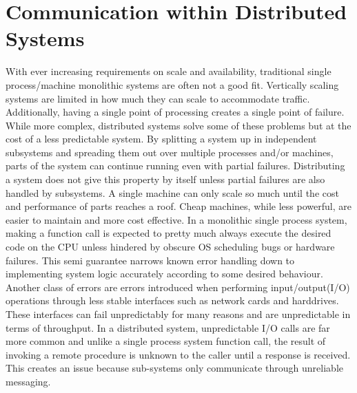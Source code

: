 \documentclass[11pt]{article}
\begin{document}
\clearpage

\tableofcontents
\clearpage
\section{Communication within Distributed Systems}
With ever increasing requirements on scale and availability, traditional single process/machine monolithic systems are often not a good fit. Vertically scaling systems are limited in how much they can scale to accommodate traffic. Additionally, having a single point of processing creates a single point of failure. While more complex, distributed systems solve some of these problems but at the cost of a less predictable system.
\newline
\newline
By splitting a system up in independent subsystems and spreading them out over multiple processes and/or machines, parts of the system can continue running even with partial failures. Distributing a system does not give this property by itself unless partial failures are also handled by subsystems. A single machine can only scale so much until the cost and performance of parts reaches a roof. Cheap machines, while less powerful, are easier to maintain and more cost effective.
\newline
\newline
In a monolithic single process system, making a function call is expected to pretty much always execute the desired code on the CPU unless hindered by obscure OS scheduling bugs or hardware failures. This semi guarantee narrows known error handling down to implementing system logic accurately according to some desired behaviour.
\newline
\newline
Another class of errors are errors introduced when performing input/output(I/O) operations through less stable interfaces such as network cards and harddrives. These interfaces can fail unpredictably for many reasons and are unpredictable in terms of throughput.
\newline
\newline
In a distributed system, unpredictable I/O calls are far more common and unlike a single process system function call, the result of invoking a remote procedure is unknown to the caller until a response is received. This creates an issue because sub-systems only communicate through unreliable messaging.
\end{document}
